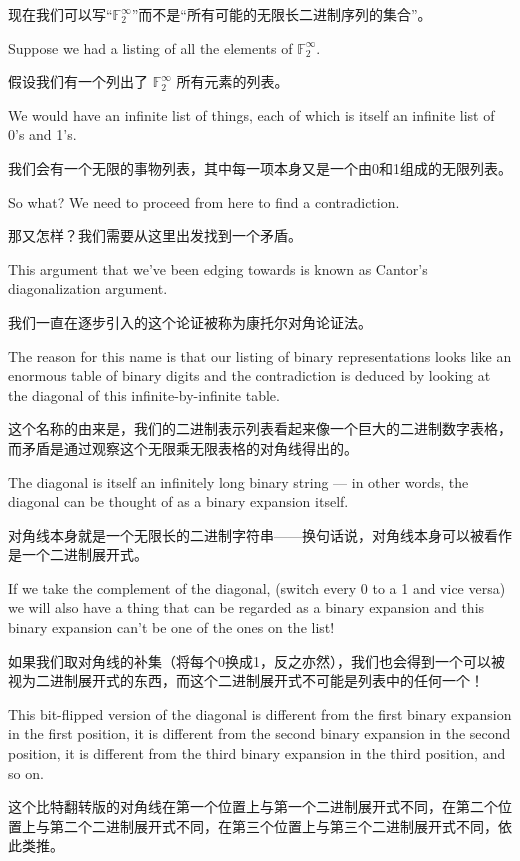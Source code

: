 现在我们可以写“${\mathbb F}_2^\infty$”而不是“所有可能的无限长二进制序列的集合”。

Suppose we had a listing of all the elements of ${\mathbb F}_2^\infty$.

假设我们有一个列出了 ${\mathbb F}_2^\infty$ 所有元素的列表。

We would have an
infinite list of things, each of which is itself an infinite list
of 0's and 1's.

我们会有一个无限的事物列表，其中每一项本身又是一个由0和1组成的无限列表。

So what? We need to proceed from here to find a contradiction.

那又怎样？我们需要从这里出发找到一个矛盾。

This argument that we've been edging towards is known as Cantor's
diagonalization argument.

我们一直在逐步引入的这个论证被称为康托尔对角论证法。

The reason for this name is that our
listing of binary representations looks like an enormous table
of binary digits and the contradiction is deduced by looking at
the diagonal of this infinite-by-infinite table.

这个名称的由来是，我们的二进制表示列表看起来像一个巨大的二进制数字表格，而矛盾是通过观察这个无限乘无限表格的对角线得出的。

The diagonal is itself an infinitely long binary string --- in other words, the
diagonal can be thought of as a binary expansion itself.

对角线本身就是一个无限长的二进制字符串——换句话说，对角线本身可以被看作是一个二进制展开式。

If we take the complement
of the diagonal, (switch every 0 to a 1 and vice versa) we will also
have a thing that can be regarded as a binary expansion and this binary
expansion can't be one of the ones on the list!

如果我们取对角线的补集（将每个0换成1，反之亦然），我们也会得到一个可以被视为二进制展开式的东西，而这个二进制展开式不可能是列表中的任何一个！

This bit-flipped version of
the diagonal is different from the first binary expansion in the first
position,
it is different from the second binary expansion in the second position, it is
different from the third binary expansion in the third position, and so on.

这个比特翻转版的对角线在第一个位置上与第一个二进制展开式不同，在第二个位置上与第二个二进制展开式不同，在第三个位置上与第三个二进制展开式不同，依此类推。

